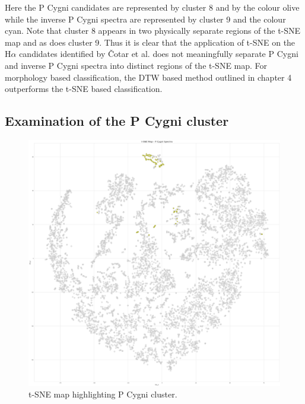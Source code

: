 Here the P Cygni candidates are represented by cluster 8 and by the colour olive while the inverse P Cygni spectra are represented by cluster 9 and the colour cyan. Note that cluster 8 appears in two physically separate regions of the t-SNE map and as does cluster 9. Thus it is clear that the application of t-SNE on the H$\alpha$ candidates identified by Čotar et al. does not meaningfully separate P Cygni and inverse P Cygni spectra into distinct regions of the t-SNE map. For morphology based classification, the DTW based method outlined in chapter 4 outperforms the t-SNE based classification.

\subsection{Examination of the P Cygni cluster}

\begin{figure}[!htb]
\centering
\includegraphics[scale=0.14]{figures/t-sne p cygni only.png}
\caption{t-SNE map highlighting P Cygni cluster.}
\end{figure}

